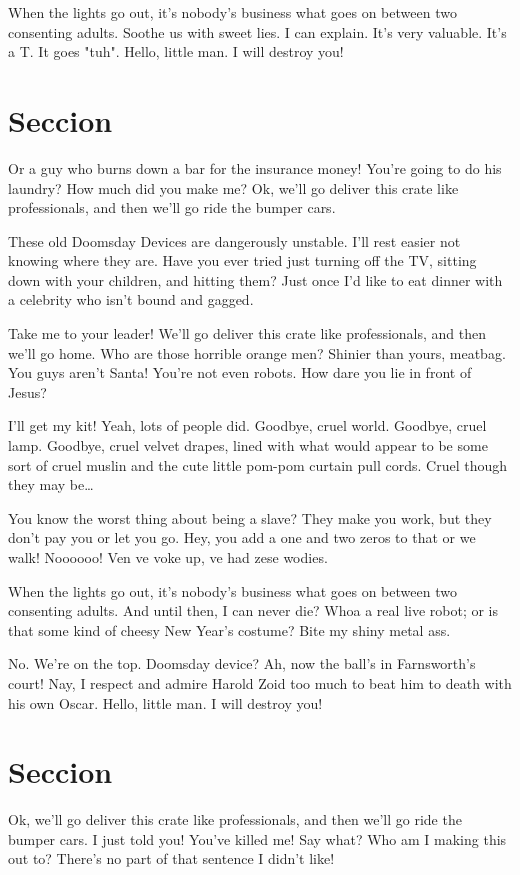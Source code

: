 \documentclass[10pt]{informe_db}
\begin{document}
When the lights go out, it's nobody's business what goes on between two consenting adults. Soothe us with sweet lies. I can explain. It's very valuable. It's a T. It goes "tuh". Hello, little man. I will destroy you!



\section{Seccion}
Or a guy who burns down a bar for the insurance money! You're going to do his laundry? How much did you make me? Ok, we'll go deliver this crate like professionals, and then we'll go ride the bumper cars.

These old Doomsday Devices are dangerously unstable. I'll rest easier not knowing where they are. Have you ever tried just turning off the TV, sitting down with your children, and hitting them? Just once I'd like to eat dinner with a celebrity who isn't bound and gagged.

Take me to your leader! We'll go deliver this crate like professionals, and then we'll go home. Who are those horrible orange men? Shinier than yours, meatbag. You guys aren't Santa! You're not even robots. How dare you lie in front of Jesus?

I'll get my kit! Yeah, lots of people did. Goodbye, cruel world. Goodbye, cruel lamp. Goodbye, cruel velvet drapes, lined with what would appear to be some sort of cruel muslin and the cute little pom-pom curtain pull cords. Cruel though they may be…

You know the worst thing about being a slave? They make you work, but they don't pay you or let you go. Hey, you add a one and two zeros to that or we walk! Noooooo! Ven ve voke up, ve had zese wodies.

When the lights go out, it's nobody's business what goes on between two consenting adults. And until then, I can never die? Whoa a real live robot; or is that some kind of cheesy New Year's costume? Bite my shiny metal ass.

No. We're on the top. Doomsday device? Ah, now the ball's in Farnsworth's court! Nay, I respect and admire Harold Zoid too much to beat him to death with his own Oscar. Hello, little man. I will destroy you!



\section{Seccion}
Ok, we'll go deliver this crate like professionals, and then we'll go ride the bumper cars. I just told you! You've killed me! Say what? Who am I making this out to? There's no part of that sentence I didn't like!
\end{document}
